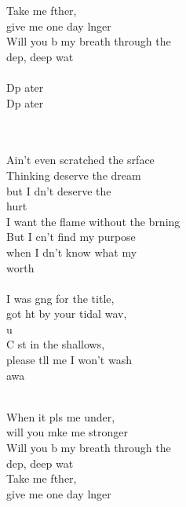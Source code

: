 \begin{cancion}
\begin{chorus}
	Take me fther, \\
	give me one day lnger\\
	Will you b my breath through the \\
	dep, deep wat\\
\jump\\
	Dp ater    \\
	Dp ater    \\
	\end{chorus}%
	\jump\\
\jump\\
	Ain't even scratched the srface\\
	Thinking  deserve the dream \\
	but I dn't deserve the \\
	hurt\\
	I want the flame without the brning\\
	But I cn't find my purpose \\
	when I dn't know what my \\
	worth \\
\jump\\
	I was gng for the title, \\
	got ht by your tidal wav, \\
	u\\
	C st in the shallows, \\
	please tll me I won't wash\\
	 awa  \\\jump\\
	\begin{chorus}%
	When it pls me under, \\
	will you mke me stronger\\
	Will you b my breath through the \\
	dep, deep wat\\
	Take me fther, \\
	give me one day lnger\\

\end{chorus}
\end{cancion}
